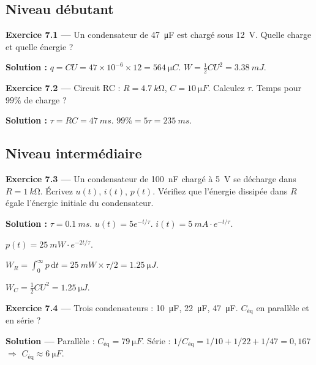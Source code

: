 \documentclass[12pt,a4paper,twoside]{book}
\begin{document}
\subsection*{Niveau débutant}

\textbf{Exercice 7.1 ---} Un condensateur de \SI{47}{\micro F} est chargé sous \SI{12}{V}. Quelle charge et quelle énergie ?

\begin{pratique}
\textbf{Solution :} $q = CU = 47\times10^{-6} \times 12 = \SI{564}{\micro C}$. $W = \frac{1}{2}CU^2 = \SI{3.38}{mJ}$.
\end{pratique}

\textbf{Exercice 7.2 ---} Circuit RC : $R = \SI{4.7}{k\ohm}$, $C = \SI{10}{\micro F}$. Calculez $\tau$. Temps pour $99\%$ de charge ?

\begin{pratique}
\textbf{Solution :} $\tau = RC = \SI{47}{ms}$. $99\% = 5\tau = \SI{235}{ms}$.
\end{pratique}

\subsection*{Niveau intermédiaire}

\textbf{Exercice 7.3 ---} Un condensateur de \SI{100}{nF} chargé à \SI{5}{V} se décharge dans $R = \SI{1}{k\ohm}$. Écrivez $u(t)$, $i(t)$, $p(t)$. Vérifiez que l'énergie dissipée dans $R$ égale l'énergie initiale du condensateur.

\begin{pratique}
\textbf{Solution :} $\tau = \SI{0.1}{ms}$. $u(t) = 5e^{-t/\tau}$. $i(t) = \SI{5}{mA} \cdot e^{-t/\tau}$.

$p(t) = \SI{25}{mW} \cdot e^{-2t/\tau}$.

$W_R = \int_0^\infty p\,\mathrm{d}t = \SI{25}{mW} \times \tau/2 = \SI{1.25}{\micro J}$.

$W_C = \frac{1}{2}CU^2 = \SI{1.25}{\micro J}$. \checkmark
\end{pratique}

\textbf{Exercice 7.4 ---} Trois condensateurs : \SI{10}{\micro F}, \SI{22}{\micro F}, \SI{47}{\micro F}. $C_{\text{éq}}$ en parallèle et en série ?

\begin{pratique}
\textbf{Solution ---} Parallèle : $C_{\text{éq}} = \SI{79}{\micro F}$. Série : $1/C_{\text{éq}} = 1/10 + 1/22 + 1/47 = 0{,}167$ $\Rightarrow$ $C_{\text{éq}} \approx \SI{6}{\micro F}$.
\end{pratique}
\end{document}
